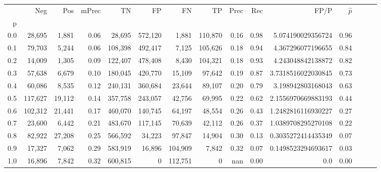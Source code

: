 \begin{tabular}{rrrrrrrrrrrrrrr}
\toprule
{} &      Neg &     Pos & mPrec &       TN &       FP &       FN &       TP &  Prec &   Rec &                FP/P & $\hat{p}$ \\
p   &          &         &       &          &          &          &          &       &       &                     &           \\
\midrule
0.0 &   28,695 &   1,881 &  0.06 &   28,695 &  572,120 &    1,881 &  110,870 &  0.16 &  0.98 &   5.074190029356724 &      0.96 \\
0.1 &   79,703 &   5,244 &  0.06 &  108,398 &  492,417 &    7,125 &  105,626 &  0.18 &  0.94 &   4.367296077196655 &      0.84 \\
0.2 &   14,009 &   1,305 &  0.09 &  122,407 &  478,408 &    8,430 &  104,321 &  0.18 &  0.93 &   4.243048842138872 &      0.82 \\
0.3 &   57,638 &   6,679 &  0.10 &  180,045 &  420,770 &   15,109 &   97,642 &  0.19 &  0.87 &  3.7318516022030845 &      0.73 \\
0.4 &   60,086 &   8,535 &  0.12 &  240,131 &  360,684 &   23,644 &   89,107 &  0.20 &  0.79 &   3.198942803168043 &      0.63 \\
0.5 &  117,627 &  19,112 &  0.14 &  357,758 &  243,057 &   42,756 &   69,995 &  0.22 &  0.62 &  2.1556970669883193 &      0.44 \\
0.6 &  102,312 &  21,441 &  0.17 &  460,070 &  140,745 &   64,197 &   48,554 &  0.26 &  0.43 &  1.2482816116930227 &      0.27 \\
0.7 &   23,600 &   6,442 &  0.21 &  483,670 &  117,145 &   70,639 &   42,112 &  0.26 &  0.37 &  1.0389708295270108 &      0.22 \\
0.8 &   82,922 &  27,208 &  0.25 &  566,592 &   34,223 &   97,847 &   14,904 &  0.30 &  0.13 &  0.3035272414435349 &      0.07 \\
0.9 &   17,327 &   7,062 &  0.29 &  583,919 &   16,896 &  104,909 &    7,842 &  0.32 &  0.07 &  0.1498523294693617 &      0.03 \\
1.0 &   16,896 &   7,842 &  0.32 &  600,815 &        0 &  112,751 &        0 &   nan &  0.00 &                 0.0 &      0.00 \\
\bottomrule
\end{tabular}
